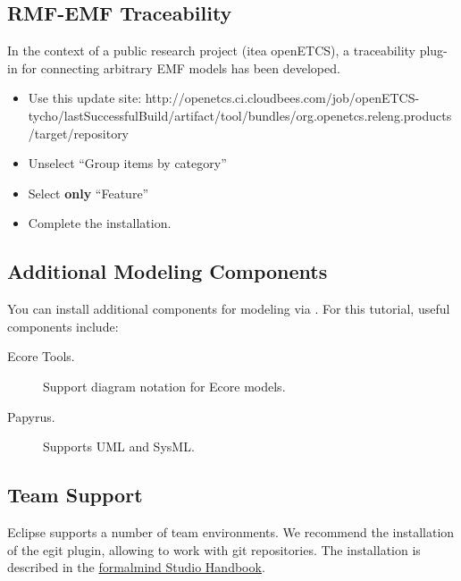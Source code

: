 \subsection{RMF-EMF Traceability}

In the context of a public research project (itea openETCS), a traceability plug-in for connecting arbitrary EMF models has been developed.

\begin{itemize}
\item Use this update site: http://openetcs.ci.cloudbees.com/job/openETCS-tycho/lastSuccessfulBuild/artifact/tool/bundles/org.openetcs.releng.products/target/repository
\item Unselect ``Group items by category''
\item Select \textbf{only} ``Feature''
\item Complete the installation.
\end{itemize}

\subsection{Additional Modeling Components}

You can install additional components for modeling via .  For this tutorial, useful components include:

\begin{description}
\item[Ecore Tools.] Support diagram notation for Ecore models.
\item[Papyrus.] Supports UML and SysML.
\end{description}

\subsection{Team Support}

Eclipse supports a number of team environments.  We recommend the installation of the egit plugin, allowing to work with git repositories.  The installation is described in the \href{http://formalmind.com/handbook?page=sec-versioning.html}{formalmind Studio Handbook}.

